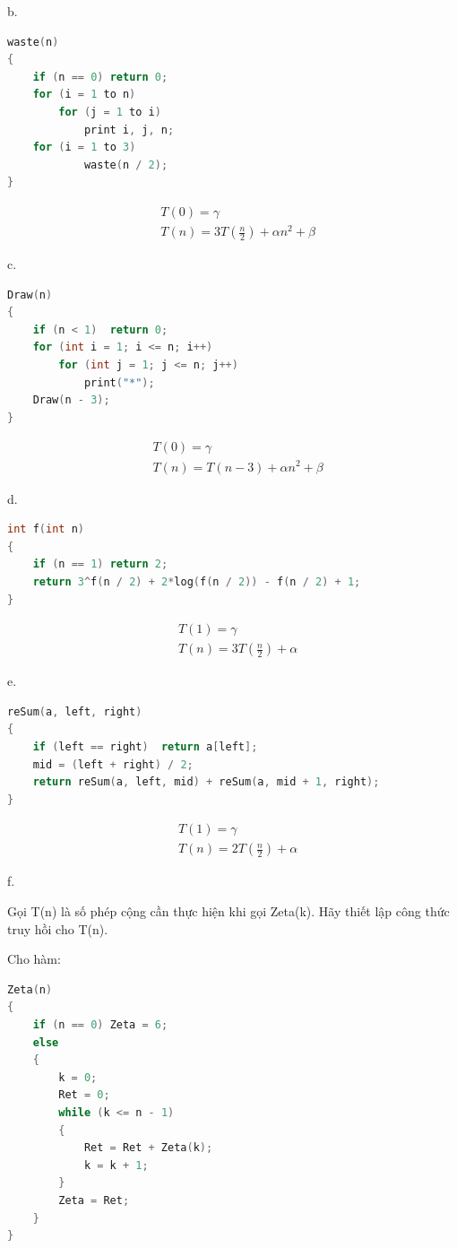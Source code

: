 \documentclass[12pt, a4paper, fleqn]{article}
\begin{document}
b.
\begin{lstlisting}[language = C++]
waste(n)
{
	if (n == 0)	return 0;
	for (i = 1 to n)
		for (j = 1 to i)
			print i, j, n;
	for (i = 1 to 3)
			waste(n / 2);
}
\end{lstlisting}
\begin{align*}
&T(0)=\gamma\\
&T(n)=3T\left(\frac{n}{2}\right) + \alpha n^2 + \beta
\end{align*}

c.
\begin{lstlisting}[language = C++]
Draw(n)
{
	if (n < 1)	return 0;
	for (int i = 1; i <= n; i++)
		for (int j = 1; j <= n; j++)
			print("*");
	Draw(n - 3);
}
\end{lstlisting}
\begin{align*}
&T(0)=\gamma\\
&T(n)=T(n-3) + \alpha n^2 + \beta
\end{align*}

d.
\begin{lstlisting}[language = C++]
int f(int n)
{
	if (n == 1)	return 2;
	return 3^f(n / 2) + 2*log(f(n / 2)) - f(n / 2) + 1;
}
\end{lstlisting}
\begin{align*}
&T(1)=\gamma\\
&T(n)=3T\left(\frac{n}{2}\right) + \alpha
\end{align*}

e.
\begin{lstlisting}[language = C++]
reSum(a, left, right)
{
	if (left == right)	return a[left];
	mid = (left + right) / 2;
	return reSum(a, left, mid) + reSum(a, mid + 1, right);
}
\end{lstlisting}
\begin{align*}
&T(1)=\gamma\\
&T(n)=2T\left(\frac{n}{2}\right) + \alpha
\end{align*}

f.

Gọi T(n) là số phép cộng cần thực hiện khi gọi Zeta(k). Hãy thiết lập công thức truy hồi cho T(n).

Cho hàm:
\begin{lstlisting}[language = C++]
Zeta(n)
{
	if (n == 0) Zeta = 6;
	else
	{
		k = 0;
		Ret = 0;
		while (k <= n - 1)
		{
			Ret = Ret + Zeta(k);
			k = k + 1;
		}
		Zeta = Ret;
	}
}
\end{lstlisting}

	
\end{document}
